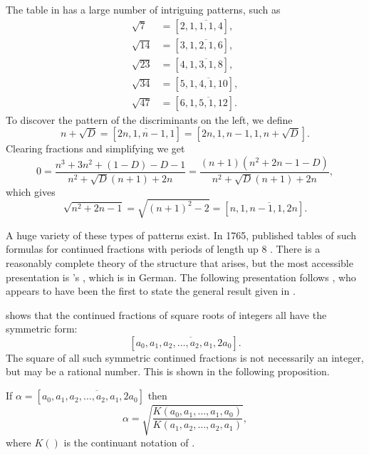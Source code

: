 The table in  has a large number of
intriguing patterns, such as
\[
\begin{aligned}
\sqrt{7}  & = [2,\overline{1, 1, 1, 4}], \\
\sqrt{14} & = [3,\overline{1, 2, 1, 6}], \\
\sqrt{23} & = [4,\overline{1, 3, 1, 8}], \\
\sqrt{34} & = [5,\overline{1, 4, 1, 10}], \\
\sqrt{47} & = [6,\overline{1, 5, 1, 12}].
\end{aligned}
\]
To discover the pattern of the discriminants on the left, we define
\[
n + \sqrt{D} = [\overline{2n, 1, n-1, 1}] = [2n, 1, n-1, 1, n+ \sqrt{D}].
\]
Clearing fractions and simplifying we get
\[
0 = \frac{n^3 + 3n^2 + (1-D) - D -1}{n^2+\sqrt{D}(n+1)+2n}
=\frac{(n+1)(n^2+2n - 1 -D)}{n^2+\sqrt{D}(n+1)+2n},
\]
which gives
\[
\sqrt{n^2+2n-1} = \sqrt{(n+1)^2-2} = [n, \overline{1, n-1, 1, 2n}].
\]

A huge variety of these types of patterns exist.  In 1765, {\Euler}
published tables of such formulas for continued fractions with periods
of length up $8$ \cite{Euler1765-ii}.  There is a reasonably complete
theory of the structure that arises, but the most accessible
presentation is {\Perron}'s \cite{Perron1977-kr}, which is in German.  The following
presentation follows {\MuirT} \cite{Muir1874-xp}, who appears to
have been the first to state the general result given in
.

 shows that the continued fractions of
square roots of integers all have the symmetric form:
\begin{equation} \label{CF:Symmetric:Eq}
[a_0, \overline{a_1, a_2, \ldots, a_2, a_1, 2a_0}].
\end{equation}
The square of all such symmetric continued fractions is not
necessarily an integer, but may be a rational number.  This is shown
in the following proposition.

\begin{proposition}\label{CF:Sqrt:Sym:Prop}
If $\alpha = [a_0, \overline{a_1, a_2, \ldots, a_2, a_1, 2a_0}]$
then 
\[
\alpha = \sqrt{\frac{K(a_0, a_1, \ldots, a_1, a_0)}{K(a_1, a_2,
\ldots,a_2, a_1)}},
\]
where $K()$ is the continuant notation of .
\end{proposition}


